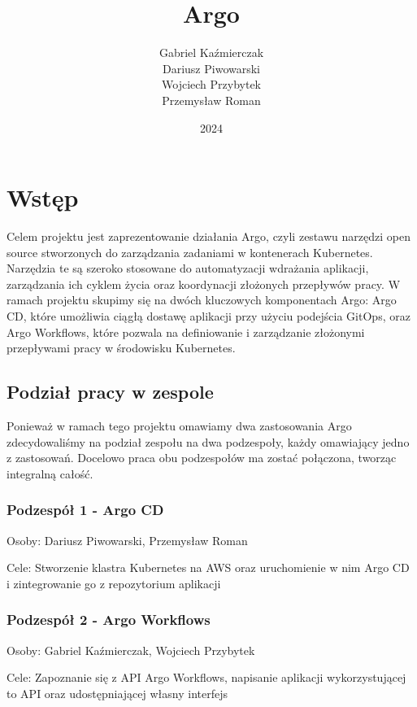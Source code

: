 \documentclass{article}
\title{\textbf{Argo}}
\author{Gabriel Kaźmierczak\\ Dariusz Piwowarski\\ Wojciech Przybytek\\ Przemysław Roman}
\date{2024}
\begin{document}
\begin{titlingpage}
\maketitle
\end{titlingpage}


\newpage
\tableofcontents


\newpage
\section{Wstęp}
Celem projektu jest zaprezentowanie działania Argo, czyli zestawu narzędzi open source stworzonych do zarządzania zadaniami w kontenerach Kubernetes. Narzędzia te są szeroko stosowane do automatyzacji wdrażania aplikacji, zarządzania ich cyklem życia oraz koordynacji złożonych przepływów pracy. W ramach projektu skupimy się na dwóch kluczowych komponentach Argo: Argo CD, które umożliwia ciągłą dostawę aplikacji przy użyciu podejścia GitOps, oraz Argo Workflows, które pozwala na definiowanie i zarządzanie złożonymi przepływami pracy w środowisku Kubernetes.

\subsection*{Podział pracy w zespole}
Ponieważ w ramach tego projektu omawiamy dwa zastosowania Argo zdecydowaliśmy na podział zespołu na dwa podzespoły, każdy omawiający jedno z zastosowań.
Docelowo praca obu podzespołów ma zostać połączona, tworząc integralną całość.

\subsubsection*{Podzespół 1 - Argo CD}
Osoby: Dariusz Piwowarski, Przemysław Roman

Cele: Stworzenie klastra Kubernetes na AWS oraz uruchomienie w nim Argo CD i zintegrowanie go z repozytorium aplikacji

\subsubsection*{Podzespół 2 - Argo Workflows}
Osoby: Gabriel Kaźmierczak, Wojciech Przybytek

Cele: Zapoznanie się z API Argo Workflows, napisanie aplikacji wykorzystującej to API oraz udostępniającej własny interfejs
\end{document}
